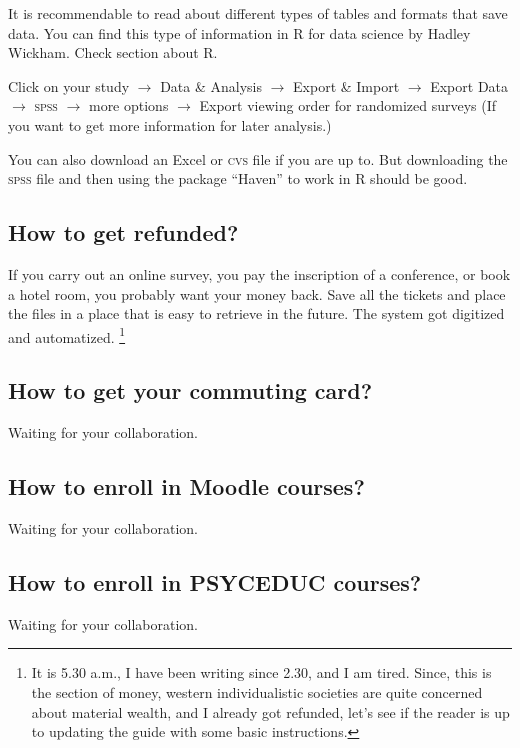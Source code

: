 \documentclass{article}
\begin{document}
It is recommendable to read about different types of tables and formats that save data. You can find this type of information in R for data science by Hadley Wickham. Check section about R. 

Click on your study $\rightarrow$ Data \& Analysis $\rightarrow$ Export \& Import $\rightarrow$ Export Data $\rightarrow$ \textsc{spss} $\rightarrow$ more options $\rightarrow$ Export viewing order for randomized surveys (If you want to get more information for later analysis.)

You can also download an Excel or \textsc{cvs} file if you are up to. But downloading the \textsc{spss} file and then using the package ``Haven'' to work in R should be good. 

\subsection{How to get refunded?}
\label{subsec: refund}
If you carry out an online survey, you pay the inscription of a conference, or book a hotel room, you probably want your money back. 
Save all the tickets and place the files in a place that is easy to retrieve in the future. The system got digitized and automatized. \footnote{  It is 5.30 a.m., I have been writing since 2.30, and I am tired. Since, this is the section of money, western individualistic societies are quite concerned about material wealth, and I already got refunded, let’s see if the reader is up to updating the guide with some basic instructions. \smiley{}}

\subsection{How to get your commuting card?}
\label{subsec: commuting}
Waiting for your collaboration. 
\subsection{How to enroll in Moodle courses?}
\label{subsec: Moodle}
Waiting for your collaboration.
\subsection{How to enroll in PSYCEDUC courses?}
\label{subsec: PSYCEDUC}
Waiting for your collaboration.
\end{document}
